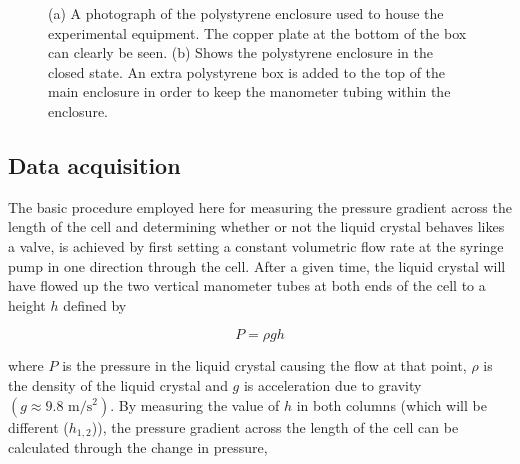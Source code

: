 \begin{figure}
\begin{center}
\end{center}
\caption[Pictures of polystyrene housing for isotropic phase experiments]{\label{fig:heat_box_photos}(a) A photograph of the polystyrene enclosure used to house the experimental equipment. The copper plate at the bottom of the box can clearly be seen. (b) Shows the polystyrene enclosure in the closed state. An extra polystyrene box is added to the top of the main enclosure in order to keep the manometer tubing within the enclosure.}
\end{figure}

\subsection{Data acquisition}
The basic procedure employed here for measuring the pressure gradient across the length of the cell and determining whether or not the liquid crystal behaves likes a valve, is achieved by first setting a constant volumetric flow rate at the syringe pump in one direction through the cell. After a given time, the liquid crystal will have flowed up the two vertical manometer tubes at both ends of the cell to a height $h$ defined by

\begin{equation}
P=\rho gh
\end{equation}

\noindent where $P$ is the pressure in the liquid crystal causing the flow at that point, $\rho$ is the density of the liquid crystal and $g$ is acceleration due to gravity $\left(g\approx9.8 \text{ m/s$^2$}\right)$. By measuring the value of $h$ in both columns (which will be different ($h_{1,2}$)), the pressure gradient across the length of the cell can be calculated through the change in pressure,

